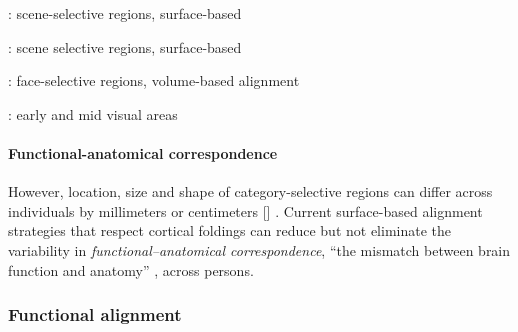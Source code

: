 \citet{zhen2017quantifying}: scene-selective regions, surface-based

\citet{weiner2018defining}: scene selective regions, surface-based

\citet{zhen2015quantifying}: face-selective regions, volume-based alignment

\citet{wang2015probabilistic}: early and mid visual areas

\citet{frost2012measuring}



\paragraph{Functional-anatomical correspondence}


However, location, size and shape of category-selective regions can differ
across individuals by millimeters or centimeters [\citep{zhen2017quantifying,
zhen2015quantifying}] \citep{feilong2018reliable}.
Current surface-based alignment strategies that respect cortical foldings
\citep{fischl2012freesurfer, yeo2009spherical} can reduce but not eliminate
\citep[e.g.,][]{coalson2018impact, benson2014correction, natu2021sulcal,
wang2015probabilistic, frost2012measuring, langers2014assessment, weiner2014mid,
rosenke2021probabilistic} the variability in \textit{functional--anatomical
correspondence}, ``the mismatch between brain function and anatomy''
\citep{feilong2018reliable}, across persons.


\subsubsection{Functional alignment}






